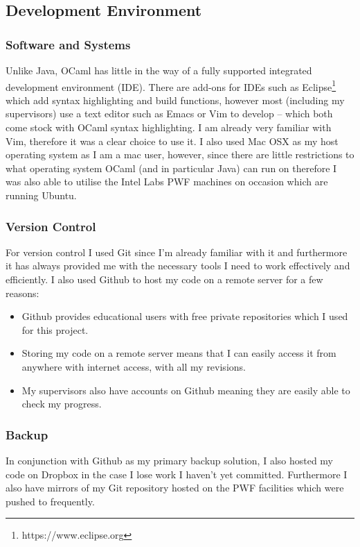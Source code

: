 \documentclass[12pt,twoside,notitlepage]{report}
\begin{document}
\subsection{Development Environment}
\label{subsec:development_environment}

\subsubsection{Software and Systems}
Unlike Java, OCaml has little in the way of a fully supported integrated development environment (IDE). There are add-ons for IDEs such as Eclipse\footnote{https://www.eclipse.org} which add syntax highlighting and build functions,
however most (including my supervisors) use a text editor such as Emacs or Vim to develop -- which both come stock with OCaml syntax highlighting. I am already very familiar with Vim, therefore it was a clear choice to use it. I also
used Mac OSX as my host operating system as I am a mac user, however, since there are little restrictions to what operating system OCaml (and in particular Java) can run on therefore I was also able to utilise the Intel Labs PWF
machines on occasion which are running Ubuntu.

\subsubsection{Version Control}
For version control I used Git since I'm already familiar with it and furthermore it has always provided me with the necessary tools I need to work effectively and efficiently. I also used Github to host my code on a remote server for
a few reasons:

\begin{itemize}
\item Github provides educational users with free private repositories which I used for this project.
\item Storing my code on a remote server means that I can easily access it from anywhere with internet access, with all my revisions.
\item My supervisors also have accounts on Github meaning they are easily able to check my progress.
\end{itemize}

\subsubsection{Backup}
\label{subsubsec:backup}
In conjunction with Github as my primary backup solution, I also hosted my code on Dropbox in the case I lose work I haven't yet committed. Furthermore I also have mirrors of my Git repository hosted on the PWF facilities which were
pushed to frequently.
\end{document}
